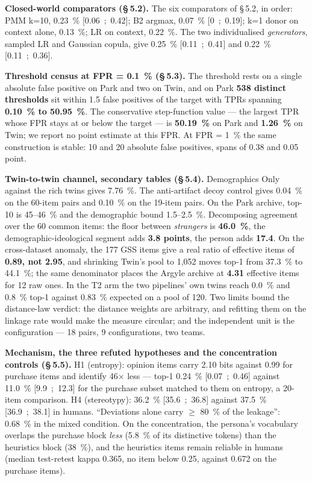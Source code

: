 \documentclass[sigconf,anonymous,review]{acmart}
\begin{document}
\textbf{Closed-world comparators (\S\,5.2).} The six comparators of \S\,5.2, in order: PMM k=10, 0.23~\% [0.06~;~0.42]; B2 argmax, 0.07~\% [0~;~0.19]; k=1 donor on context alone, 0.13~\%; LR on context, 0.22~\%. The two individualised \textit{generators}, sampled LR and Gaussian copula, give 0.25~\% [0.11~;~0.41] and 0.22~\% [0.11~;~0.36].

\textbf{Threshold census at FPR = 0.1~\% (\S\,5.3).} The threshold rests on a single absolute false positive on Park and two on Twin, and on Park \textbf{538 distinct thresholds} sit within 1.5 false positives of the target with TPRs spanning \textbf{0.10~\% to 50.95~\%}. The conservative step-function value --- the largest TPR whose FPR stays at or below the target --- is \textbf{50.19~\%} on Park and \textbf{1.26~\%} on Twin; we report no point estimate at this FPR. At FPR = 1~\% the same construction is stable: 10 and 20 absolute false positives, spans of 0.38 and 0.05 point.

\textbf{Twin-to-twin channel, secondary tables (\S\,5.4).} Demographics Only against the rich twins gives 7.76~\%. The anti-artifact decoy control gives 0.04~\% on the 60-item pairs and 0.10~\% on the 19-item pairs. On the Park archive, top-10 is 45--46~\% and the demographic bound 1.5--2.5~\%. Decomposing agreement over the 60 common items: the floor between \textit{strangers} is \textbf{46.0~\%}, the demographic-ideological segment adds \textbf{3.8 points}, the person adds \textbf{17.4}. On the cross-dataset anomaly, the 177 GSS items give a real ratio of effective items of \textbf{0.89, not 2.95}, and shrinking Twin's pool to 1,052 moves top-1 from 37.3~\% to 44.1~\%; the same denominator places the Argyle archive at \textbf{4.31} effective items for 12 raw ones. In the T2 arm the two pipelines' own twins reach 0.0~\% and 0.8~\% top-1 against 0.83~\% expected on a pool of 120. Two limits bound the distance-law verdict: the distance weights are arbitrary, and refitting them on the linkage rate would make the measure circular; and the independent unit is the configuration --- 18 pairs, 9 configurations, two teams.

\textbf{Mechanism, the three refuted hypotheses and the concentration controls (\S\,5.5).} H1 (entropy): opinion items carry 2.10 bits against 0.99 for purchase items and identify 46$\times$ less --- top-1 0.24~\% [0.07~;~0.46] against 11.0~\% [9.9~;~12.3] for the purchase subset matched to them on entropy, a 20-item comparison. H4 (stereotypy): 36.2~\% [35.6~;~36.8] against 37.5~\% [36.9~;~38.1] in humans. ``Deviations alone carry $\geq$ 80~\% of the leakage'': 0.68~\% in the mixed condition. On the concentration, the persona's vocabulary overlaps the purchase block \textit{less} (5.8~\% of its distinctive tokens) than the heuristics block (38~\%), and the heuristics items remain reliable in humans (median test-retest kappa 0.365, no item below 0.25, against 0.672 on the purchase items).
\end{document}
